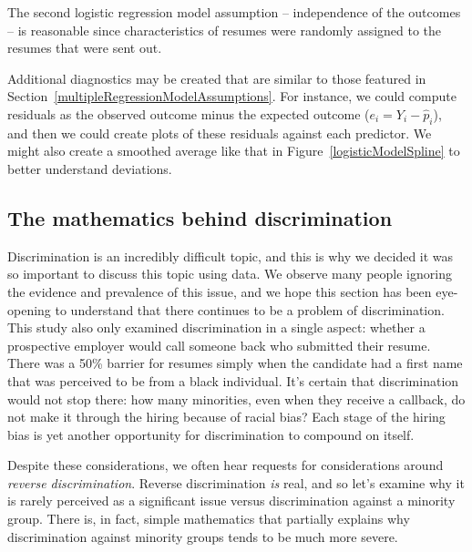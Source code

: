 The second logistic regression model assumption
-- independence of the outcomes --
is reasonable since characteristics of resumes were
randomly assigned to the resumes that were sent out.

Additional diagnostics may be created that are similar to those
featured in Section~\ref{multipleRegressionModelAssumptions}.
For instance, we could compute residuals as
the observed outcome minus the expected outcome
($e_i = Y_i - \hat{p}_i$),
and then we could create plots of these residuals
against each predictor.
We might also create a smoothed average like that in
Figure~\ref{logisticModelSpline} to better understand
deviations.




\subsection{The mathematics behind discrimination}



Discrimination is an incredibly difficult topic,
and this is why we decided it was so important to discuss
this topic using data.
We observe many people ignoring the evidence
and prevalence of this issue, and we hope this section
has been eye-opening to understand that there continues
to be a problem of discrimination.
This study also only examined discrimination in a single
aspect: whether a prospective employer would call someone
back who submitted their resume.
There was a 50\% barrier for resumes simply when the
candidate had a first name that was perceived to be
from a black individual.
It's certain that discrimination would not stop there:
how many minorities, even when they receive a callback,
do not make it through the hiring because of racial bias?
Each stage of the hiring bias is yet another opportunity
for discrimination to compound on itself.

Despite these considerations, we often hear requests
for considerations around \emph{reverse discrimination}.
%
Reverse discrimination \emph{is} real, and so let's
examine why it is rarely perceived as a significant
issue versus discrimination against a minority group.
There is, in fact, simple mathematics that partially
explains why discrimination against minority groups
tends to be much more severe.

